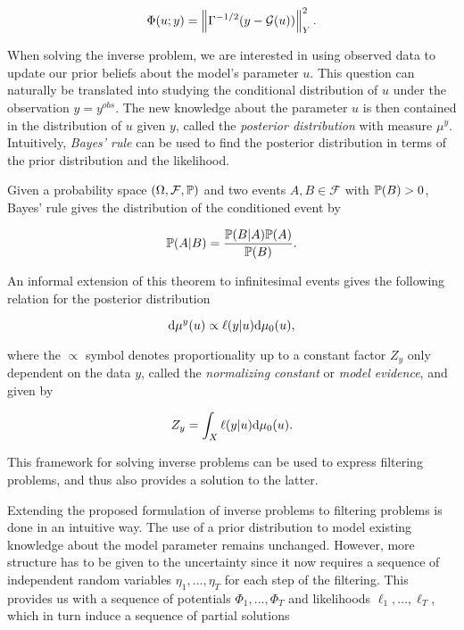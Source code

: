 \begin{equation} \label{gaussian-potential}
  \Phi(u; y) = \norm{\Gamma^{-1/2}(y - \G(u))}_Y^2.
\end{equation}

When solving the inverse problem, we are interested in using observed data to update our prior beliefs about the model's parameter $u$. This question can naturally be translated into studying the conditional distribution of $u$ under the observation $y = y^{obs}$. The new knowledge about the parameter $u$ is then contained in the distribution of $u$ given $y$, called the \textit{posterior distribution} with measure $\mu^y$. Intuitively, \textit{Bayes' rule} can be used to find the posterior distribution in terms of the prior distribution and the likelihood.

Given a probability space $(\Omega, \mathcal{F}, \P)$ and two events $A, B \in \mathcal{F}$ with $\P(B) > 0$, Bayes' rule gives the distribution of the conditioned event by

\begin{equation*}
  \P(A|B) = \frac{\P(B|A)\P(A)}{\P(B)}.
\end{equation*}

An informal extension of this theorem to infinitesimal events gives the following relation for the posterior distribution 

\begin{equation}\label{bayes-rule}
  \d\mu^y(u) \propto \ell(y|u)\d\mu_0(u),
\end{equation}

where the $\propto$ symbol denotes proportionality up to a constant factor $Z_y$ only dependent on the data $y$, called the \textit{normalizing constant} or \textit{model evidence}, and given by

\begin{equation}
 Z_y = \int_X \ell(y|u)\d\mu_0(u).
\end{equation}

This framework for solving inverse problems can be used to express filtering problems, and thus also provides a solution to the latter. 

Extending the proposed formulation of inverse problems to filtering problems is done in an intuitive way. The use of a prior distribution to model existing knowledge about the model parameter remains unchanged. However, more structure has to be given to the uncertainty since it now requires a sequence of independent random variables $\eta_1, \ldots, \eta_T$ for each step of the filtering. This provides us with a sequence of potentials $\Phi_1, \ldots, \Phi_T$ and likelihoods $\ell_1, \ldots, \ell_T$, which in turn induce a sequence of partial solutions

